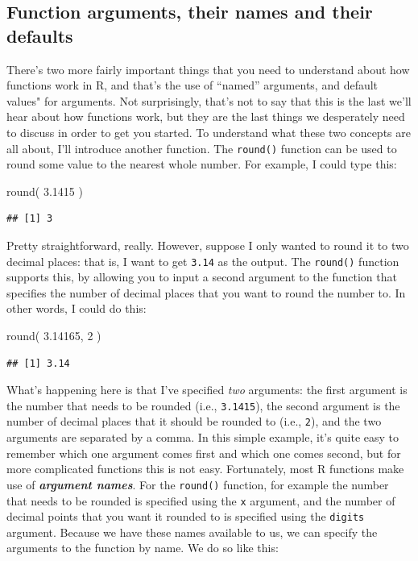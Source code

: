 \documentclass[
]{book}
\newenvironment{Shaded}{\begin{snugshade}}{\end{snugshade}}
\newcommand{\DecValTok}[1]{\textcolor[rgb]{0.00,0.00,0.81}{#1}}
\newcommand{\FloatTok}[1]{\textcolor[rgb]{0.00,0.00,0.81}{#1}}
\newcommand{\FunctionTok}[1]{\textcolor[rgb]{0.00,0.00,0.00}{#1}}
\newcommand{\NormalTok}[1]{#1}
\begin{document}
\hypertarget{functionarguments}{%
\subsection{Function arguments, their names and their defaults}\label{functionarguments}}

There's two more fairly important things that you need to understand about how functions work in R, and that's the use of ``named'' arguments, and default values" for arguments. Not surprisingly, that's not to say that this is the last we'll hear about how functions work, but they are the last things we desperately need to discuss in order to get you started. To understand what these two concepts are all about, I'll introduce another function. The \texttt{round()} function can be used to round some value to the nearest whole number. For example, I could type this:

\begin{Shaded}
\begin{Highlighting}[]
\FunctionTok{round}\NormalTok{( }\FloatTok{3.1415}\NormalTok{ )}
\end{Highlighting}
\end{Shaded}

\begin{verbatim}
## [1] 3
\end{verbatim}

Pretty straightforward, really. However, suppose I only wanted to round it to two decimal places: that is, I want to get \texttt{3.14} as the output. The \texttt{round()} function supports this, by allowing you to input a second argument to the function that specifies the number of decimal places that you want to round the number to. In other words, I could do this:

\begin{Shaded}
\begin{Highlighting}[]
\FunctionTok{round}\NormalTok{( }\FloatTok{3.14165}\NormalTok{, }\DecValTok{2}\NormalTok{ )}
\end{Highlighting}
\end{Shaded}

\begin{verbatim}
## [1] 3.14
\end{verbatim}

What's happening here is that I've specified \emph{two} arguments: the first argument is the number that needs to be rounded (i.e., \texttt{3.1415}), the second argument is the number of decimal places that it should be rounded to (i.e., \texttt{2}), and the two arguments are separated by a comma. In this simple example, it's quite easy to remember which one argument comes first and which one comes second, but for more complicated functions this is not easy. Fortunately, most R functions make use of \textbf{\emph{argument names}}. For the \texttt{round()} function, for example the number that needs to be rounded is specified using the \texttt{x} argument, and the number of decimal points that you want it rounded to is specified using the \texttt{digits} argument. Because we have these names available to us, we can specify the arguments to the function by name. We do so like this:
\end{document}
